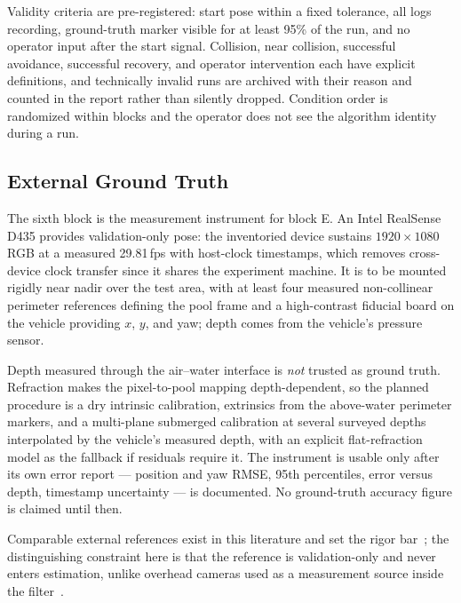 Validity criteria are pre-registered: start pose within a fixed tolerance,
all logs recording, ground-truth marker visible for at least 95\% of the run,
and no operator input after the start signal. Collision, near collision,
successful avoidance, successful recovery, and operator intervention each
have explicit definitions, and technically invalid runs are archived with
their reason and counted in the report rather than silently dropped.
Condition order is randomized within blocks and the operator does not see the
algorithm identity during a run. \POOL

\subsection{External Ground Truth}

The sixth block is the measurement instrument for block E. An Intel
RealSense D435 provides validation-only pose: the inventoried device
sustains $1920{\times}1080$ RGB at a measured 29.81\,fps with host-clock
timestamps, which removes cross-device clock transfer since it shares the
experiment machine. It is to be mounted rigidly near nadir over the test
area, with at least four measured non-collinear perimeter references defining
the pool frame and a high-contrast fiducial board on the vehicle providing
$x$, $y$, and yaw; depth comes from the vehicle's pressure sensor.

Depth measured through the air--water interface is \emph{not} trusted as
ground truth. Refraction makes the pixel-to-pool mapping depth-dependent, so
the planned procedure is a dry intrinsic calibration, extrinsics from the
above-water perimeter markers, and a multi-plane submerged calibration at
several surveyed depths interpolated by the vehicle's measured depth, with an
explicit flat-refraction model as the fallback if residuals require it. The
instrument is usable only after its own error report --- position and yaw
RMSE, 95th percentiles, error versus depth, timestamp uncertainty --- is
documented. No ground-truth accuracy figure is claimed until then. \POOL

Comparable external references exist in this literature and set the rigor
bar~\cite{winkel2023designim,yang2025duvindif}; the distinguishing constraint
here is that the reference is validation-only and never enters estimation,
unlike overhead cameras used as a measurement source inside the
filter~\cite{alineipoiana2024abluerov}.
